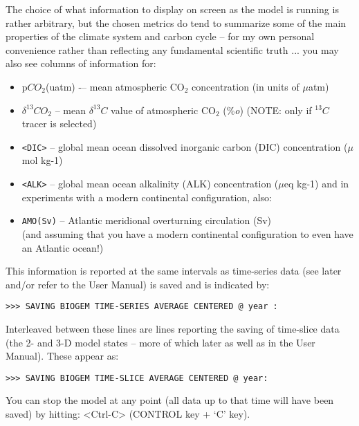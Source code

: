 \documentclass[11pt,fleqn]{book} %
\begin{document}
The choice of what information to display on screen as the model is running is rather arbitrary, but the chosen metrics do tend to summarize some of the main properties of the climate system and carbon cycle – for my own personal convenience rather than reflecting any fundamental scientific truth ... you may also see columns of information for:

\begin{itemize}
\item[] p\(CO_{2}\)(uatm) -– mean atmospheric CO\(_{2}\) concentration (in units of \(\mu\)atm)
\item[] \(\delta^{13}CO_{2}\)  – mean \(\delta^{13}C\) value of atmospheric CO\(_{2}\) (\%\textit{o}) (NOTE: only if \(^{13}C\) tracer is selected)
\item[] \texttt{<DIC>} -- global mean ocean dissolved inorganic carbon (DIC) concentration (\(\mu\)mol kg-1)
\item[] \texttt{<ALK>}   – global mean ocean alkalinity (ALK) concentration (\(\mu\)eq kg-1) and in experiments with a modern continental configuration, also:
\item \texttt{AMO(Sv)} -- Atlantic meridional overturning circulation (Sv)
\\(and assuming that you have a modern continental configuration to even have an Atlantic ocean!)
\end{itemize}

This information is reported at the same intervals as time-series data (see later and/or refer to the User Manual) is saved and is indicated by:

\vspace{-2mm}
\begin{verbatim}
>>> SAVING BIOGEM TIME-SERIES AVERAGE CENTERED @ year :
\end{verbatim}
\vspace{-2mm}

Interleaved between these lines are lines reporting the saving of time-slice data (the 2- and 3-D model states – more of which later as well as in the User Manual). These appear as:

\vspace{-2mm}
\begin{verbatim}
>>> SAVING BIOGEM TIME-SLICE AVERAGE CENTERED @ year:
\end{verbatim}
\vspace{-2mm}

You can stop the model at any point (all data up to that time will have been saved) by hitting: \textsf{<Ctrl-C>} (\textsf{CONTROL} key + ‘\textsf{C}’ key).
\end{document}
